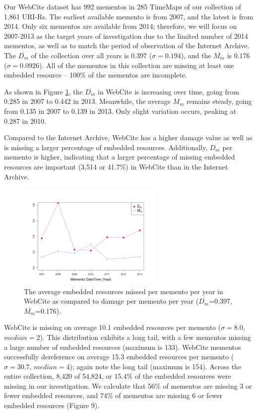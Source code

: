 Our WebCite dataset has 992 mementos in 285 TimeMaps of our collection of 1,861 URI-Rs. The earliest available memento is from 2007, and the latest is from 2014. Only six mementos are available from 2014; therefore, we will focus on 2007-2013 as the target years of investigation due to the limited number of 2014 mementos, as well as to match the period of observation of the Internet Archive. The $\overline{D_m}$ of the collection over all years is $0.397$ ($\sigma=0.194$), and the $\overline{M_m}$ is $0.176$ ($\sigma=0.0926$). All of the mementos in this collection are missing at least one embedded resource -- 100\% of the mementos are incomplete. 

As shown in Figure \ref{missingByYearWC}, the $\overline{D_m}$ in WebCite is increasing over time, going from 0.285 in 2007 to 0.442 in 2013. Meanwhile, the average $M_m$ remains steady, going from 0.135 in 2007 to 0.139 in 2013. Only slight variation occurs, peaking at 0.287 in 2010. 

Compared to the Internet Archive, WebCite has a higher damage value as well as is missing a larger percentage of embedded resources. Additionally, $D_m$ per memento is higher, indicating that a larger percentage of missing embedded resources are important (3,514 or 41.7\%) in WebCite than in the Internet Archive.

\begin{figure}[h!]
\includegraphics[width=270px]{./imgs/MissedAndDamagePerYear_webcite.png}
\caption{The average embedded resources missed per memento per year in WebCite as compared to damage per memento per year ($\overline{D_m}$=0.397, $\overline{M_m}$=0.176).}
\label{missingByYearWC}
\end{figure}

WebCite is missing on average 10.1 embedded resources per memento ($\sigma=8.0$, $median=2$). This distribution exhibits a long tail, with a few mementos missing a large number of embedded resources (maximum is 133). WebCite mementos successfully dereference on average 15.3 embedded resources per memento ($\sigma=30.7$, $median=4$); again note the long tail (maximum is 154). Across the entire collection, 8,420 of 54,824, or 15.4\% of the embedded resources were missing in our investigation. We calculate that 56\% of mementos are missing 3 or fewer embedded resources, and 74\% of mementos are missing 6 or fewer embedded resources (Figure 9).

